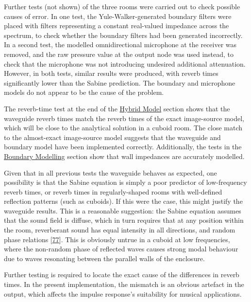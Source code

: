\documentclass[]{scrreprt}
\begin{document}
Further tests (not shown) of the three rooms were carried out to check
possible causes of error. In one test, the Yule-Walker-generated
boundary filters were placed with filters representing a constant
real-valued impedance across the spectrum, to check whether the boundary
filters had been generated incorrectly. In a second test, the modelled
omnidirectional microphone at the receiver was removed, and the raw
pressure value at the output node was used instead, to check that the
microphone was not introducing undesired additional attenuation.
However, in both tests, similar results were produced, with reverb times
significantly lower than the Sabine prediction. The boundary and
microphone models do not appear to be the cause of the problem.

The reverb-time test at the end of the
\href{\%7B\%7B\%20site.baseurl\%20\%7D\%7D\%7B\%\%20link\%20hybrid.md\%20\%\%7D}{Hybrid
Model} section shows that the waveguide reverb times match the reverb
times of the exact image-source model, which will be close to the
analytical solution in a cuboid room. The close match to the
almost-exact image-source model suggests that the waveguide and boundary
model have been implemented correctly. Additionally, the tests in the
\href{\%7B\%7B\%20site.baseurl\%20\%7D\%7D\%7B\%\%20link\%20boundary.md\%20\%\%7D}{Boundary
Modelling} section show that wall impedances are accurately modelled.

Given that in all previous tests the waveguide behaves as expected, one
possibility is that the Sabine equation is simply a poor predictor of
low-frequency reverb times, or reverb times in regularly-shaped rooms
with well-defined reflection patterns (such as cuboids). If this were
the case, this might justify the waveguide results. This is a reasonable
suggestion: the Sabine equation assumes that the sound field is diffuse,
which in turn requires that at any position within the room, reverberant
sound has equal intensity in all directions, and random phase relations
{[}\protect\hyperlink{ref-hodgsonux5fwhenux5f1994}{77}{]}. This is
obviously untrue in a cuboid at low frequencies, where the non-random
phase of reflected waves causes strong modal behaviour due to waves
resonating between the parallel walls of the enclosure.

Further testing is required to locate the exact cause of the differences
in reverb times. In the present implementation, the mismatch is an
obvious artefact in the output, which affects the impulse response's
suitability for musical applications.
\end{document}

